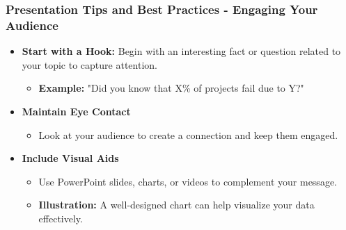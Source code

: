 \documentclass[aspectratio=169]{beamer}
\begin{document}
\begin{frame}[fragile]
    \frametitle{Presentation Tips and Best Practices - Engaging Your Audience}
    \begin{itemize}
        \item \textbf{Start with a Hook:} Begin with an interesting fact or question related to your topic to capture attention.
        \begin{itemize}
            \item \textbf{Example:} "Did you know that X\% of projects fail due to Y?"
        \end{itemize}

        \item \textbf{Maintain Eye Contact}
        \begin{itemize}
            \item Look at your audience to create a connection and keep them engaged.
        \end{itemize}

        \item \textbf{Include Visual Aids}
        \begin{itemize}
            \item Use PowerPoint slides, charts, or videos to complement your message.
            \item \textbf{Illustration:} A well-designed chart can help visualize your data effectively.
        \end{itemize}
    \end{itemize}
\end{frame}
\end{document}
